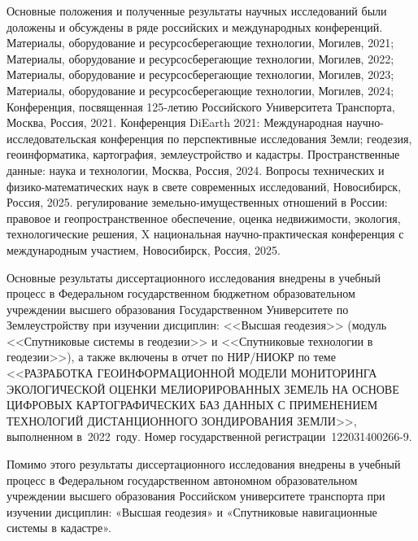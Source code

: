 {\probation}

Основные положения и полученные результаты научных исследований были доложены и обсуждены в ряде российских и международных конференций. Материалы, оборудование и ресурсосберегающие технологии, Могилев, 2021; Материалы, оборудование и ресурсосберегающие технологии, Могилев, 2022; Материалы, оборудование и ресурсосберегающие технологии, Могилев, 2023; Материалы, оборудование и ресурсосберегающие технологии, Могилев, 2024;  Конференция, посвященная 125-летию Российского Университета Транспорта, Москва, Россия, 2021. Конференция DiEarth 2021: Международная научно-исследовательская конференция по перспективные исследования Земли; геодезия, геоинформатика, картография, землеустройство и кадастры. Пространственные данные: наука и технологии, Москва, Россия, 2024. Вопросы технических и физико-математических наук в свете современных исследований, Новосибирск, Россия, 2025. регулирование земельно-имущественных отношений в России: правовое и геопространственное обеспечение, оценка недвижимости, экология, технологические решения, X национальная научно-практическая конференция с международным участием, Новосибирск, Россия, 2025.


Основные результаты диссертационного исследования внедрены в учебный процесс в Федеральном государственном бюджетном образовательном учреждении высшего образования Государственном Университете по Землеустройству при изучении дисциплин: <<Высшая геодезия>> (модуль <<Спутниковые системы в геодезии>> и <<Спутниковые технологии в геодезии>>), а также включены в отчет по НИР/НИОКР по теме 
<<РАЗРАБОТКА ГЕОИНФОРМАЦИОННОЙ МОДЕЛИ МОНИТОРИНГА ЭКОЛОГИЧЕСКОЙ ОЦЕНКИ МЕЛИОРИРОВАННЫХ ЗЕМЕЛЬ НА ОСНОВЕ ЦИФРОВЫХ КАРТОГРАФИЧЕСКИХ БАЗ ДАННЫХ С ПРИМЕНЕНИЕМ ТЕХНОЛОГИЙ ДИСТАНЦИОННОГО ЗОНДИРОВАНИЯ ЗЕМЛИ>>, 
выполненном в~2022~году. Номер государственной регистрации~122031400266-9.

Помимо этого результаты диссертационного исследования внедрены в учебный процесс в Федеральном государственном автономном образовательном учреждении высшего образования Российском университете транспорта при изучении дисциплин: «Высшая геодезия» и «Спутниковые навигационные системы в кадастре». 

